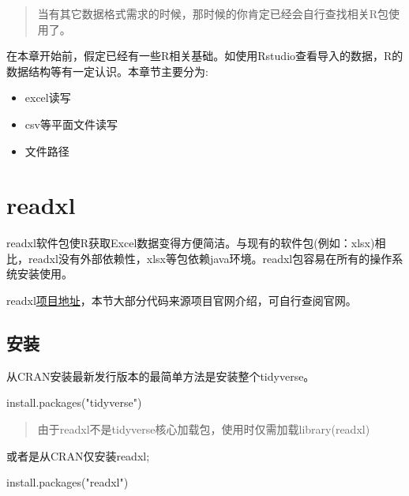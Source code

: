 \documentclass[
]{book}
\newenvironment{Shaded}{\begin{snugshade}}{\end{snugshade}}
\newcommand{\FunctionTok}[1]{\textcolor[rgb]{0.00,0.00,0.00}{#1}}
\newcommand{\NormalTok}[1]{#1}
\newcommand{\StringTok}[1]{\textcolor[rgb]{0.31,0.60,0.02}{#1}}
\providecommand{\tightlist}{%
  \setlength{\itemsep}{0pt}\setlength{\parskip}{0pt}}
\begin{document}
\begin{quote}
当有其它数据格式需求的时候，那时候的你肯定已经会自行查找相关R包使用了。
\end{quote}

在本章开始前，假定已经有一些R相关基础。如使用Rstudio查看导入的数据，R的数据结构等有一定认识。本章节主要分为:

\begin{itemize}
\tightlist
\item
  excel读写
\item
  csv等平面文件读写
\item
  文件路径
\end{itemize}

\hypertarget{data:readxl}{%
\section{readxl}\label{data:readxl}}

readxl软件包使R获取Excel数据变得方便简洁。与现有的软件包(例如：xlsx)相比，readxl没有外部依赖性，xlsx等包依赖java环境。readxl包容易在所有的操作系统安装使用。

readxl\href{https://readxl.tidyverse.org/}{项目地址}，本节大部分代码来源项目官网介绍，可自行查阅官网。

\hypertarget{ux5b89ux88c5}{%
\subsection{安装}\label{ux5b89ux88c5}}

从CRAN安装最新发行版本的最简单方法是安装整个tidyverse。

\begin{Shaded}
\begin{Highlighting}[]
\FunctionTok{install.packages}\NormalTok{(}\StringTok{"tidyverse"}\NormalTok{)}
\end{Highlighting}
\end{Shaded}

\begin{quote}
由于readxl不是tidyverse核心加载包，使用时仅需加载library(readxl)
\end{quote}

或者是从CRAN仅安装readxl;

\begin{Shaded}
\begin{Highlighting}[]
\FunctionTok{install.packages}\NormalTok{(}\StringTok{"readxl"}\NormalTok{)}
\end{Highlighting}
\end{Shaded}
\end{document}
